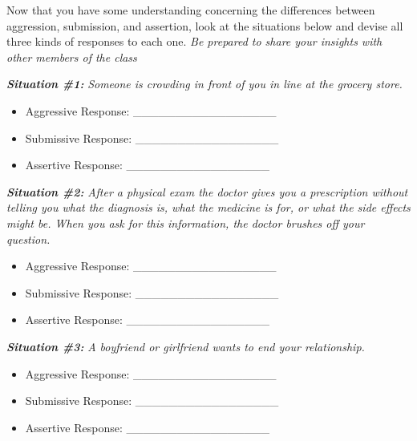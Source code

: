 \documentclass[
]{book}
\providecommand{\tightlist}{%
  \setlength{\itemsep}{0pt}\setlength{\parskip}{0pt}}
\begin{document}
\begin{reflect}
Now that you have some understanding concerning the differences between aggression, submission, and assertion, look at the situations below and devise all three kinds of responses to each one. \emph{Be prepared to share your insights with other members of the class}

\textbf{\emph{Situation \#1:}} \emph{Someone is crowding in front of you in line at the grocery store.}

\begin{itemize}
\tightlist
\item
  Aggressive Response: \_\_\_\_\_\_\_\_\_\_\_\_\_\_\_\_\_\\
\item
  Submissive Response: \_\_\_\_\_\_\_\_\_\_\_\_\_\_\_\_\_\\
\item
  Assertive Response: \_\_\_\_\_\_\_\_\_\_\_\_\_\_\_\_\_
\end{itemize}

\textbf{\emph{Situation \#2:}} \emph{After a physical exam the doctor gives you a prescription without telling you what the diagnosis is, what the medicine is for, or what the side effects might be. When you ask for this information, the doctor brushes off your question.}

\begin{itemize}
\tightlist
\item
  Aggressive Response: \_\_\_\_\_\_\_\_\_\_\_\_\_\_\_\_\_\\
\item
  Submissive Response: \_\_\_\_\_\_\_\_\_\_\_\_\_\_\_\_\_\\
\item
  Assertive Response: \_\_\_\_\_\_\_\_\_\_\_\_\_\_\_\_\_
\end{itemize}

\textbf{\emph{Situation \#3:}} \emph{A boyfriend or girlfriend wants to end your relationship.}

\begin{itemize}
\tightlist
\item
  Aggressive Response: \_\_\_\_\_\_\_\_\_\_\_\_\_\_\_\_\_\\
\item
  Submissive Response: \_\_\_\_\_\_\_\_\_\_\_\_\_\_\_\_\_\\
\item
  Assertive Response: \_\_\_\_\_\_\_\_\_\_\_\_\_\_\_\_\_
\end{itemize}


\end{reflect}
\end{document}
